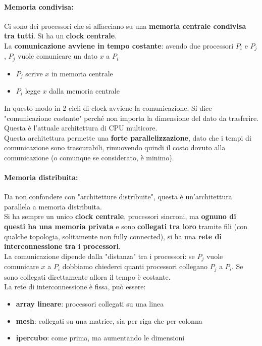 \paragraph{Memoria condivisa:} Ci sono dei processori che si affacciano su una \textbf{memoria centrale condivisa tra tutti}. Si ha un \textbf{clock centrale}.\\
La \textbf{comunicazione avviene in tempo costante}: avendo due processori $P_i$ e $P_j$, $P_j$ vuole comunicare un dato $x$ a $P_i$
\begin{itemize}
	\item $P_j$ scrive $x$ in memoria centrale
	\item $P_i$ legge $x$ dalla memoria centrale
\end{itemize}

In questo modo in 2 cicli di clock avviene la comunicazione. Si dice "comunicazione costante" perché non importa la dimensione del dato da trasferire. Questa è l'attuale architettura di CPU multicore. \\

Questa architettura permette una \textbf{forte parallelizzazione}, dato che i tempi di comunicazione sono trascurabili, rimuovendo quindi il costo dovuto alla comunicazione (o comunque se considerato, è minimo).\\

\paragraph{Memoria distribuita:} Da non confondere con "architetture distribuite", questa è un'architettura parallela a memoria distribuita.\\
Si ha sempre un unico \textbf{clock centrale}, processori sincroni, ma \textbf{ognuno di questi ha una memoria privata} e sono \textbf{collegati tra loro} tramite fili (con qualche topologia, solitamente non fully connected), si ha una \textbf{rete di interconnessione tra i processori}.\\

La comunicazione dipende dalla "distanza" tra i processori: se $P_j$ vuole comunicare $x$ a $P_i$ dobbiamo chiederci quanti processori collegano $P_j$ a $P_i$. Se sono collegati direttamente allora il tempo è costante.\\

La rete di interconnessione è fissa, può essere: 
\begin{itemize}
	\item \textbf{array lineare}: processori collegati su una linea
	\item \textbf{mesh}: collegati su una matrice, sia per riga che per colonna
	\item \textbf{ipercubo}: come prima, ma aumentando le dimensioni
\end{itemize}

